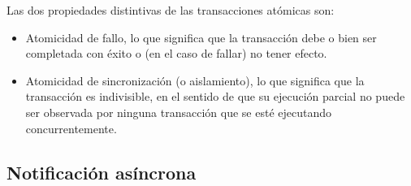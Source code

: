 Las dos propiedades distintivas de las transacciones atómicas son:

\begin{itemize}
	\item Atomicidad de fallo, lo que significa que la transacción debe o
		bien ser completada con éxito o (en el caso de fallar) no tener
		efecto.
	\item Atomicidad de sincronización (o aislamiento), lo que significa
		que la transacción es indivisible, en el sentido de que su
		ejecución parcial no puede ser observada por ninguna transacción
		que se esté ejecutando concurrentemente.
\end{itemize}

\subsection{Notificación asíncrona}
